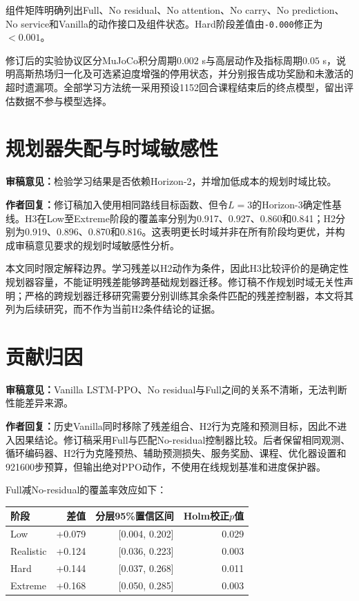 \documentclass[UTF8,fontset=none]{ctexart}
\newcommand{\reviewcomment}[1]{\par\noindent\textbf{审稿意见：}#1\par}
\newcommand{\authorresponse}[1]{\par\noindent\textbf{作者回复：}#1\par}
\begin{document}
组件矩阵明确列出Full、No residual、No attention、No carry、No prediction、No service和Vanilla的动作接口及组件状态。Hard阶段差值由\texttt{-0.000}修正为$<0.001$。

修订后的实验协议区分MuJoCo积分周期$0.002$ s与高层动作及指标周期$0.05$ s，说明高斯热场归一化及可选紧迫度增强的停用状态，并分别报告成功奖励和未激活的超时遗漏项。全部学习方法统一采用预设1152回合课程结束后的终点模型，留出评估数据不参与模型选择。

\section{规划器失配与时域敏感性}
\reviewcomment{检验学习结果是否依赖Horizon-2，并增加低成本的规划时域比较。}

\authorresponse{修订稿加入使用相同路线目标函数、但令$L=3$的Horizon-3确定性基线。H3在Low至Extreme阶段的覆盖率分别为0.917、0.927、0.860和0.841；H2分别为0.919、0.896、0.870和0.816。这表明更长时域并非在所有阶段均更优，并构成审稿意见要求的规划时域敏感性分析。}

本文同时限定解释边界。学习残差以H2动作为条件，因此H3比较评价的是确定性规划器容量，不能证明残差能够跨基础规划器迁移。修订稿不作规划时域无关性声明；严格的跨规划器迁移研究需要分别训练其余条件匹配的残差控制器，本文将其列为后续研究，而不作为当前H2条件结论的证据。

\section{贡献归因}
\reviewcomment{Vanilla LSTM-PPO、No residual与Full之间的关系不清晰，无法判断性能差异来源。}

\authorresponse{历史Vanilla同时移除了残差组合、H2行为克隆和预测目标，因此不进入因果结论。修订稿采用Full与匹配No-residual控制器比较。后者保留相同观测、循环编码器、H2行为克隆预热、辅助预测损失、服务奖励、课程、优化器设置和921600步预算，但输出绝对PPO动作，不使用在线规划基准和进度保护器。}

Full减No-residual的覆盖率效应如下：
\begin{center}
\begin{tabular}{lrrr}
\toprule
阶段 & 差值 & 分层95\%置信区间 & Holm校正$p$值\\
\midrule
Low & +0.079 & [0.004, 0.202] & 0.029\\
Realistic & +0.124 & [0.036, 0.223] & 0.003\\
Hard & +0.144 & [0.037, 0.268] & 0.011\\
Extreme & +0.168 & [0.050, 0.285] & 0.003\\
\bottomrule
\end{tabular}
\end{center}
\end{document}
